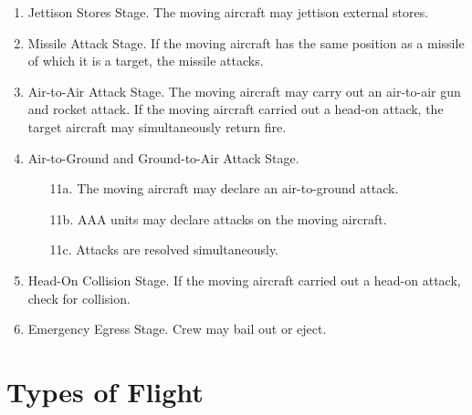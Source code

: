 {\begin{enumerate}
\begin{enumerate}
                \item The moving aircraft may expend an FP to change position (map location and altitude). For the purposes of expending FPs to fulfill turn requirements, preparations for maneuvers, recovery, aiming, and tracking, the FP is considered to have been expended as soon as the aircraft starts to move.

                \item If the moving aircraft is turning and has expended FPs at least equal to the turn requirement (including the current one), it may complete the turn and change facing.

                \item If the moving aircraft is not turning, it may set its bank according to the rules.

            \end{enumerate}

        \item Jettison Stores Stage. The moving aircraft may jettison external stores.
        \item Missile Attack Stage. If the moving aircraft has the same position as a missile of which it is a target, the missile attacks.
        \item Air-to-Air Attack Stage. The moving aircraft may carry out an air-to-air gun and rocket attack. If the moving aircraft carried out a head-on attack, the target aircraft may simultaneously return fire.
        \item Air-to-Ground and Ground-to-Air Attack Stage.
            \begin{enumerate}
                \item[11a.] The moving aircraft may declare an air-to-ground attack.
                \item[11b.] AAA units may declare attacks on the moving aircraft.
                \item[11c.] Attacks are resolved simultaneously.
            \end{enumerate}
        \item Head-On Collision Stage. If the moving aircraft carried out a head-on attack, check for collision.
        \item Emergency Egress Stage. Crew may bail out or eject.
    \end{enumerate}
}

\section{Types of Flight}

